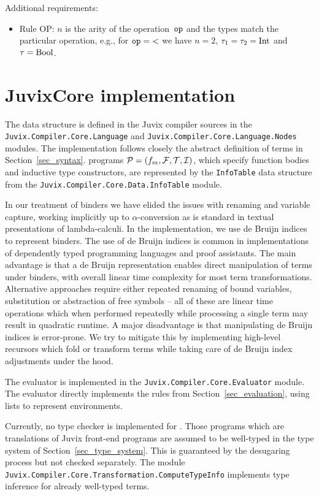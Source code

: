\documentclass[
    9pt,            %
    techreport,        %
    affiltop,       %
]{art}
\begin{document}
Additional requirements:
\begin{itemize}
\item Rule OP: $n$ is the arity of the operation~$\mathtt{op}$ and the types match
the particular operation, e.g., for $\mathtt{op} = {<}$ we have $n=2$,
$\tau_1=\tau_2=\mathrm{Int}$ and $\tau=\mathrm{Bool}$.
\end{itemize}

\section{JuvixCore implementation}\label{sec_core_implementation}

The \JuvixCore{} data structure is defined in the Juvix compiler sources in
the \texttt{Juvix.Compiler.Core.Language} and
\texttt{Juvix.Compiler.Core.Language.Nodes} modules. The implementation
follows closely the abstract definition of terms in
Section~\ref{sec_syntax}. \JuvixCore{} programs $\mathcal{P} = (f_m,\mathcal{F},\mathcal{T},\mathcal{I})$,
which specify function bodies and inductive type constructors, are
represented by the \texttt{InfoTable} data structure from the
\texttt{Juvix.Compiler.Core.Data.InfoTable} module.

In our treatment of binders we have elided the issues with renaming and
variable capture, working implicitly up to $\alpha$-conversion as is
standard in textual presentations of lambda-calculi. In the implementation,
we use de Bruijn indices to represent binders. The use of de Bruijn indices
is common in implementations of dependently typed programming languages and
proof assistants. The main advantage is that a de Bruijn representation
enables direct manipulation of terms under binders, with overall linear
time complexity for most term transformations. Alternative approaches
require either repeated renaming of bound variables, substitution or
abstraction of free symbols -- all of these are linear time operations
which when performed repeatedly while processing a single term may result
in quadratic runtime. A major disadvantage is that manipulating de Bruijn
indices is error-prone. We try to mitigate this by implementing high-level
recursors which fold or transform \JuvixCore{} terms while taking care of
de Bruijn index adjustments under the hood.

The \JuvixCore{} evaluator is implemented in the
\texttt{Juvix.Compiler.Core.Evaluator} module. The evaluator directly
implements the rules from Section~\ref{sec_evaluation}, using lists to
represent environments. 

Currently, no type checker is implemented for \JuvixCore{}. Those
\JuvixCore{} programs which are translations of Juvix front-end programs
are assumed to be well-typed in the type system of
Section~\ref{sec_type_system}. This is guaranteed by the desugaring process
but not checked separately. The module
\texttt{Juvix.Compiler.Core.Transformation.ComputeTypeInfo} implements type
inference for already well-typed terms.
\end{document}

